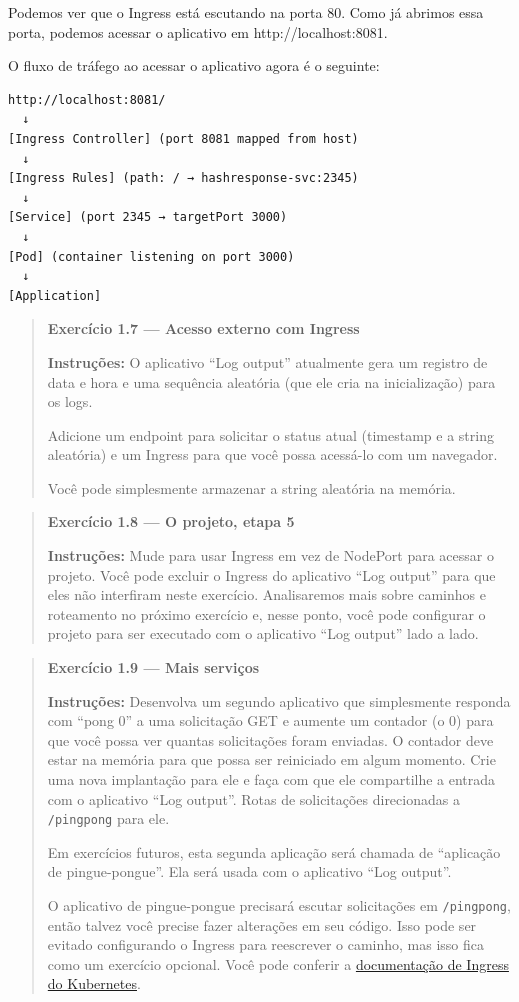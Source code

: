 \documentclass[
]{article}
\begin{document}
Podemos ver que o Ingress está escutando na porta 80. Como já abrimos
essa porta, podemos acessar o aplicativo em http://localhost:8081.

O fluxo de tráfego ao acessar o aplicativo agora é o seguinte:

\begin{verbatim}
http://localhost:8081/
  ↓
[Ingress Controller] (port 8081 mapped from host)
  ↓
[Ingress Rules] (path: / → hashresponse-svc:2345)
  ↓
[Service] (port 2345 → targetPort 3000)
  ↓
[Pod] (container listening on port 3000)
  ↓
[Application]
\end{verbatim}

\begin{quote}
\textbf{Exercício 1.7 --- Acesso externo com Ingress}

\textbf{Instruções:} O aplicativo ``Log output'' atualmente gera um
registro de data e hora e uma sequência aleatória (que ele cria na
inicialização) para os logs.

Adicione um endpoint para solicitar o status atual (timestamp e a string
aleatória) e um Ingress para que você possa acessá-lo com um navegador.

Você pode simplesmente armazenar a string aleatória na memória.
\end{quote}

\begin{quote}
\textbf{Exercício 1.8 --- O projeto, etapa 5}

\textbf{Instruções:} Mude para usar Ingress em vez de NodePort para
acessar o projeto. Você pode excluir o Ingress do aplicativo ``Log
output'' para que eles não interfiram neste exercício. Analisaremos mais
sobre caminhos e roteamento no próximo exercício e, nesse ponto, você
pode configurar o projeto para ser executado com o aplicativo ``Log
output'' lado a lado.
\end{quote}

\begin{quote}
\textbf{Exercício 1.9 --- Mais serviços}

\textbf{Instruções:} Desenvolva um segundo aplicativo que simplesmente
responda com ``pong 0'' a uma solicitação GET e aumente um contador (o
0) para que você possa ver quantas solicitações foram enviadas. O
contador deve estar na memória para que possa ser reiniciado em algum
momento. Crie uma nova implantação para ele e faça com que ele
compartilhe a entrada com o aplicativo ``Log output''. Rotas de
solicitações direcionadas a \texttt{/pingpong} para ele.

Em exercícios futuros, esta segunda aplicação será chamada de
``aplicação de pingue-pongue''. Ela será usada com o aplicativo ``Log
output''.

O aplicativo de pingue-pongue precisará escutar solicitações em
\texttt{/pingpong}, então talvez você precise fazer alterações em seu
código. Isso pode ser evitado configurando o Ingress para reescrever o
caminho, mas isso fica como um exercício opcional. Você pode conferir a
\href{https://kubernetes.io/docs/concepts/services-networking/ingress/\#the-ingress-resource}{documentação
de Ingress do Kubernetes}.
\end{quote}
\end{document}
